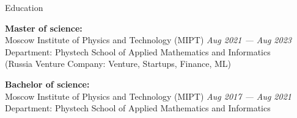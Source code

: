 \documentclass{resume} %
\begin{document}
\begin{rSection}{ Education }

{\bf Master of science:} \\
{Moscow Institute of Physics and Technology (MIPT)} \hfill {\em Aug 2021 — Aug 2023} \\ 
{Department:} {Phystech School of Applied Mathematics and Informatics} \\ (Russia Venture Company: Venture, Startups, Finance, ML) 

{\bf Bachelor of science:} \\
{Moscow Institute of Physics and Technology (MIPT)} \hfill {\em Aug 2017 — Aug 2021} \\ 
{Department:} {Phystech School of Applied Mathematics and Informatics}

\end{rSection}
\end{document}

